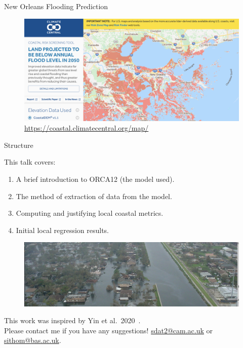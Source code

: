 \begin{frame}{New Orleans Flooding Prediction~\cite{kulp2019new, kulp2018coastaldem}}
\vspace{-20pt}
\begin{figure}[htb!]
    \centering
   \hspace{-20pt}
    \includegraphics[width=0.9\paperwidth]{images/example-images/new-orleans-surge.png}
    \vspace{-7pt}
    \caption{\url{https://coastal.climatecentral.org/map/}}
    \label{fig:}
\end{figure}
\end{frame}

\begin{frame}{Structure}

This talk covers:
\vspace{5pt}

\begin{enumerate}
    \item A brief introduction to ORCA12 (the model used).
    \item The method of extraction of data from the model.
    \item Computing and justifying local coastal metrics.
    \item Initial local regression results.
\end{enumerate}

\begin{figure}[htb!]
    \includegraphics[width=0.9\linewidth]{images/example-images/new-orleans.jpg}
\end{figure}

This work was inspired by Yin et al.~2020~\cite{ZannaPreprint}.\\
Please contact me if you have any suggestions!
\href{mailto:sdat2@cam.ac.uk}{sdat2@cam.ac.uk}
or \href{mailto:sithom@bas.ac.uk}{sithom@bas.ac.uk}.

\end{frame}
